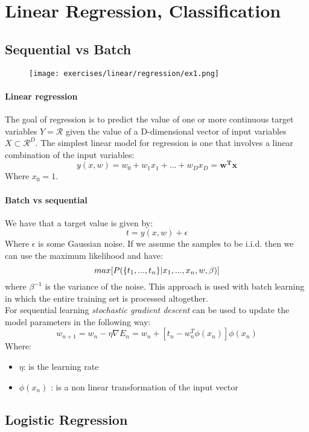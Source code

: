 \section{Linear Regression, Classification}

\subsection{Sequential vs Batch }

\begin{figure}[H]
    \centering
    \texttt{[image: exercises/linear/regression/ex1.png]}
\end{figure}
 

\paragraph{Linear regression}
The goal of regression is to predict the value of one or more continuous target variables $Y=\mathcal{R}$ given the value of a D-dimensional vector of input variables $X \subset \mathcal{R}^D$. The simplest linear model for regression is one that involves a linear combination of the input variables:
\[y(x,w)=w_0+w_1x_1+...+w_Dx_D=\bm{w^Tx}\]
Where $x_0=1$.

\paragraph{Batch vs sequential}


We have that a target value is given by:
\[t=y(x,w) + \epsilon\]
Where $\epsilon$ is some Gaussian noise. If we assume the samples to be i.i.d. then we can use the maximum likelihood and have:
\[max[P(\lbrace{t_1,...,t_n}\rbrace|x_1,...,x_n,w,\beta)]\]
where $\beta^{-1}$ is the variance of the noise. This approach is used with batch learning in which the entire training set is processed altogether.\\

For sequential learning \textit{stochastic gradient descent} can be used to update the model parameters in the following way:
\[w_{n+1}=w_n-\eta \nabla E_n= w_n +[t_n -w_n^T \phi(x_n)]\phi(x_n)\]
Where:
\begin{itemize}
\item $\eta$: is the learning rate 
\item $\phi(x_n)$ : is a non linear transformation of the input vector
\end{itemize}

\subsection{Logistic Regression }

